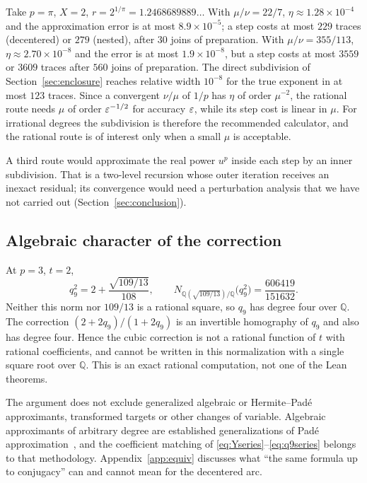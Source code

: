 \begin{remark}\label{rem:pi}
Take $p=\pi$, $X=2$, $r=2^{1/\pi}=1.2468689889\ldots$ With $\mu/\nu=22/7$, $\eta\approx1.28\times10^{-4}$
and the approximation error is at most $8.9\times10^{-5}$; a step costs at most $229$ traces (decentered)
or $279$ (nested), after $30$ joins of preparation. With $\mu/\nu=355/113$, $\eta\approx2.70\times10^{-8}$
and the error is at most $1.9\times10^{-8}$, but a step costs at most $3559$ or $3609$ traces after $560$
joins of preparation. The direct subdivision of Section~\ref{sec:enclosure} reaches relative width
$10^{-8}$ for the true exponent in at most $123$ traces. Since a convergent $\nu/\mu$ of $1/p$ has
$\eta$ of order $\mu^{-2}$, the rational route needs $\mu$ of order $\varepsilon^{-1/2}$ for accuracy $\varepsilon$,
while its step cost is linear in $\mu$. For irrational degrees the subdivision is therefore the
recommended calculator, and the rational route is of interest only when a small $\mu$ is acceptable.
\end{remark}

A third route would approximate the real power $u^{p}$ inside each step by an inner subdivision. That
is a two-level recursion whose outer iteration receives an inexact residual; its convergence would need
a perturbation analysis that we have not carried out (Section~\ref{sec:conclusion}).

\subsection{Algebraic character of the correction}\label{sec:algebraic}

At $p=3$, $t=2$,
\[ q_9^{2}=2+\frac{\sqrt{109/13}}{108},\qquad
N_{\mathbb{Q}(\sqrt{109/13})/\mathbb{Q}}\bigl(q_9^{2}\bigr)=\frac{606419}{151632}. \]
Neither this norm nor $109/13$ is a rational square, so $q_9$ has degree four over $\mathbb{Q}$. The
correction $(2+2q_9)/(1+2q_9)$ is an invertible homography of $q_9$ and also has degree four. Hence
the cubic correction is not a rational function of $t$ with rational coefficients, and cannot be written
in this normalization with a single square root over $\mathbb{Q}$. This is an exact rational computation,
not one of the Lean theorems.

The argument does not exclude generalized algebraic or Hermite--Pad\'e approximants, transformed targets
or other changes of variable. Algebraic approximants of arbitrary degree are established generalizations
of Pad\'e approximation~\cite{sergeev}, and the coefficient matching of \eqref{eq:Yseries}--\eqref{eq:q9series}
belongs to that methodology. Appendix~\ref{app:equiv} discusses what ``the same formula up to
conjugacy'' can and cannot mean for the decentered arc.
